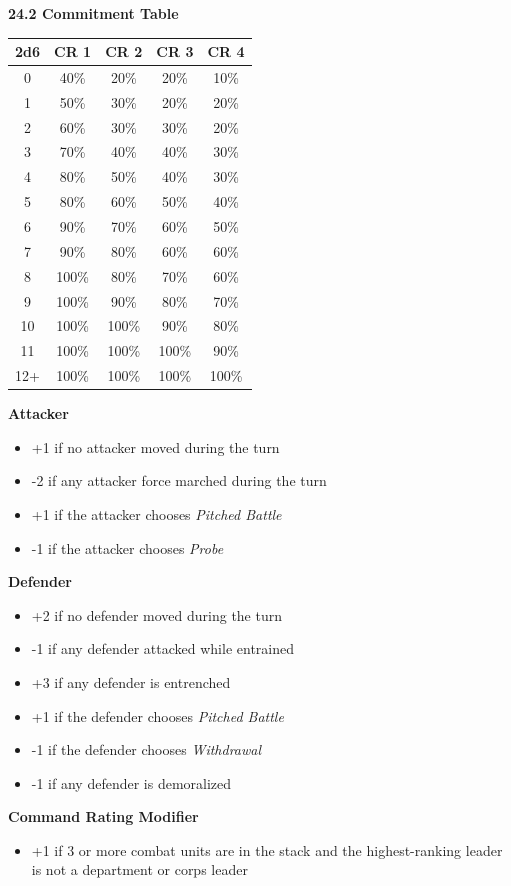 \begin{minipage}[t]{0.40\textwidth}
\textbf{24.2 Commitment Table}

\vspace{0.4em}
\centering
\scriptsize
\begin{tabular}{c*{4}{c}}
\toprule
\textbf{2d6} & \textbf{CR 1} & \textbf{CR 2} & \textbf{CR 3} & \textbf{CR 4} \\
\midrule
0 & 40\% & 20\% & 20\% & 10\% \\
1 & 50\% & 30\% & 20\% & 20\% \\
2 & 60\% & 30\% & 30\% & 20\% \\
3 & 70\% & 40\% & 40\% & 30\% \\
4 & 80\% & 50\% & 40\% & 30\% \\
5 & 80\% & 60\% & 50\% & 40\% \\
6 & 90\% & 70\% & 60\% & 50\% \\
7 & 90\% & 80\% & 60\% & 60\% \\
8 & 100\% & 80\% & 70\% & 60\% \\
9 & 100\% & 90\% & 80\% & 70\% \\
10 & 100\% & 100\% & 90\% & 80\% \\
11 & 100\% & 100\% & 100\% & 90\% \\
12+ & 100\% & 100\% & 100\% & 100\% \\
\bottomrule
\end{tabular}

\vspace{0.5em}
\raggedright
\scriptsize
\textbf{Attacker}
\begin{itemize}
\item +1 if no attacker moved during the turn
\item -2 if any attacker force marched during the turn
\item +1 if the attacker chooses \textit{Pitched Battle}
\item -1 if the attacker chooses \textit{Probe}
\end{itemize}

\textbf{Defender}
\begin{itemize}
\item +2 if no defender moved during the turn
\item -1 if any defender attacked while entrained
\item +3 if any defender is entrenched
\item +1 if the defender chooses \textit{Pitched Battle}
\item -1 if the defender chooses \textit{Withdrawal}
\item -1 if any defender is demoralized
\end{itemize}

\textbf{Command Rating Modifier}
\begin{itemize}
\item +1 if 3 or more combat units are in the stack and the highest-ranking leader is not a department or corps leader
\end{itemize}
\end{minipage}

